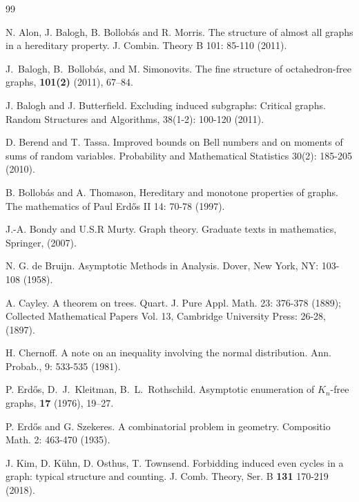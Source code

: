 \documentclass[12pt]{article}
\theoremstyle{definition}
\begin{document}
 
\begin{thebibliography}{99}

 N. Alon, J. Balogh, B. Bollob\'{a}s and R. Morris.
\newblock The structure of almost all graphs in a hereditary property.
\newblock J. Combin. Theory B 101: 85-110 (2011).


\newblock J.~Balogh, B.~Bollob\'as, and M. Simonovits.
\newblock The fine structure of octahedron-free graphs,
 {\bf 101(2)} (2011), 67--84.


 J. Balogh and J. Butterfield.
\newblock Excluding induced subgraphs: Critical graphs.
\newblock Random Structures and Algorithms, 38(1-2): 100-120 (2011).

 D. Berend and T. Tassa. 
\newblock Improved bounds on Bell numbers and on moments of sums of random variables.
\newblock Probability and Mathematical Statistics 30(2): 185-205 (2010).

 B. Bollob\'{a}s and A. Thomason,
\newblock Hereditary and monotone properties of graphs.
\newblock The mathematics of Paul Erd\H{o}s II 14: 70-78 (1997).

 J.-A. Bondy and U.S.R Murty.
\newblock Graph theory. 
\newblock Graduate texts in mathematics, Springer, (2007). 

 N. G. de Bruijn.
\newblock Asymptotic Methods in Analysis.
\newblock Dover, New York, NY: 103-108 (1958).

 A. Cayley.
\newblock A theorem on trees.
\newblock Quart. J. Pure Appl. Math. 23: 376-378 (1889); Collected Mathematical Papers Vol. 13, Cambridge University Press: 26-28, (1897).

 H. Chernoff.
\newblock A note on an inequality involving the normal distribution.
\newblock Ann. Probab., 9: 533-535 (1981).

\newblock P. Erd\H os, D.~J.~Kleitman, B.~L.~Rothschild.
\newblock Asymptotic enumeration of $K_n$-free graphs,
 {\bf 17} (1976), 19--27.

 P. Erd\H{o}s and G. Szekeres. 
\newblock A combinatorial problem in geometry. 
\newblock Compositio Math. 2:  463-470 (1935).

 J. Kim, D. K\"{u}hn, D. Osthus, T. Townsend.
\newblock Forbidding induced even cycles in a graph: typical structure and counting.
\newblock J. Comb. Theory, Ser. B {\bf 131} 170-219 (2018).


\end{thebibliography}
\end{document}
